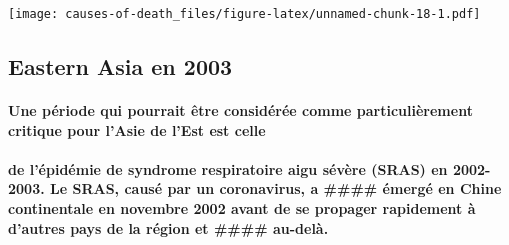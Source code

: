 \documentclass[
]{article}
\begin{document}
\texttt{[image: causes-of-death\_files/figure-latex/unnamed-chunk-18-1.pdf]}

\hypertarget{eastern-asia-en-2003}{%
\subsection{Eastern Asia en 2003}\label{eastern-asia-en-2003}}

\hypertarget{une-puxe9riode-qui-pourrait-uxeatre-considuxe9ruxe9e-comme-particuliuxe8rement-critique-pour-lasie-de-lest-est-celle}{%
\paragraph{Une période qui pourrait être considérée comme
particulièrement critique pour l'Asie de l'Est est
celle}\label{une-puxe9riode-qui-pourrait-uxeatre-considuxe9ruxe9e-comme-particuliuxe8rement-critique-pour-lasie-de-lest-est-celle}}

\hypertarget{de-luxe9piduxe9mie-de-syndrome-respiratoire-aigu-suxe9vuxe8re-sras-en-2002-2003.-le-sras-causuxe9-par-un-coronavirus-a-uxe9merguxe9-en-chine-continentale-en-novembre-2002-avant-de-se-propager-rapidement-uxe0-dautres-pays-de-la-ruxe9gion-et-au-deluxe0.}{%
\paragraph{de l'épidémie de syndrome respiratoire aigu sévère (SRAS) en
2002-2003. Le SRAS, causé par un coronavirus, a \#\#\#\# émergé en Chine
continentale en novembre 2002 avant de se propager rapidement à d'autres
pays de la région et \#\#\#\#
au-delà.}\label{de-luxe9piduxe9mie-de-syndrome-respiratoire-aigu-suxe9vuxe8re-sras-en-2002-2003.-le-sras-causuxe9-par-un-coronavirus-a-uxe9merguxe9-en-chine-continentale-en-novembre-2002-avant-de-se-propager-rapidement-uxe0-dautres-pays-de-la-ruxe9gion-et-au-deluxe0.}}
\end{document}
